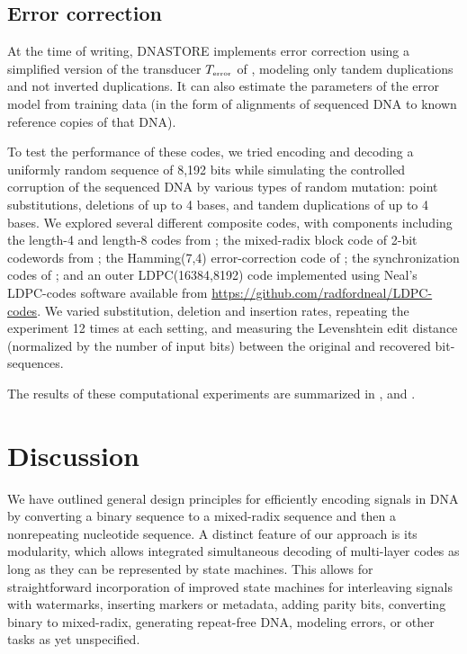 \documentclass[english]{article}
\begin{document}
\subsection{Error correction}

At the time of writing,
DNASTORE implements error correction using a simplified version of the transducer $T_{\mbox{\tiny error}}$
of , modeling only tandem duplications and not inverted duplications.
It can also estimate the parameters of the error model from training data
(in the form of alignments of sequenced DNA to known reference copies of that DNA).

To test the performance of these codes, we tried encoding and decoding a uniformly random sequence of 8,192 bits
while simulating the controlled corruption of the sequenced DNA by various types of random mutation:
point substitutions, deletions of up to 4 bases, and tandem duplications of up to 4 bases.
We explored several different composite codes, with components including
the length-4 and length-8 codes from ;
the mixed-radix block code of 2-bit codewords from ;
the Hamming(7,4) error-correction code of ;
the synchronization codes of ;
and an outer LDPC(16384,8192) code implemented using Neal's LDPC-codes
software available from \url{https://github.com/radfordneal/LDPC-codes}.
We varied substitution, deletion and insertion rates, repeating the experiment 12 times at each setting,
and measuring the Levenshtein edit distance (normalized by the number of input bits) between the original and recovered bit-sequences.

The results of these computational experiments are summarized in ,  and .


\section{Discussion}

We have outlined general design principles for efficiently encoding signals in DNA
by converting a binary sequence to a mixed-radix sequence and then a nonrepeating nucleotide sequence.
A distinct feature of our approach is its modularity,
which allows integrated simultaneous decoding of multi-layer codes as long as they can be represented by state machines.
This allows for straightforward incorporation of improved state machines for
interleaving signals with watermarks, inserting markers or metadata, adding parity bits, converting binary to mixed-radix, generating repeat-free DNA,
modeling errors, or other tasks as yet unspecified.
\end{document}
